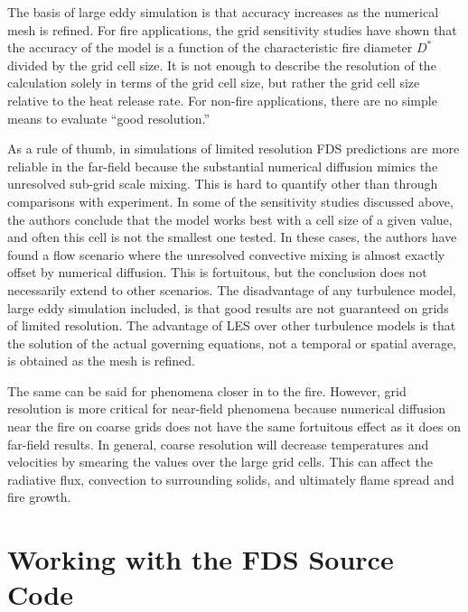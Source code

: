 \documentclass[11pt]{book}
\begin{document}
The basis of  large eddy simulation is that  accuracy increases as the
numerical mesh is refined. For fire applications, the grid sensitivity
studies have shown that the accuracy of the model is a function of the
characteristic fire diameter  $D^*$ divided by the grid  cell size. It
is not enough to describe  the resolution of the calculation solely in
terms of the grid cell size, but rather the grid cell size relative to
the heat release rate.  For non-fire applications, there are no simple
means to evaluate ``good resolution.''

As  a  rule  of  thumb,  in  simulations  of  limited  resolution  FDS
predictions are more reliable in the far-field because the substantial
numerical diffusion mimics the  unresolved sub-grid scale mixing. This
is hard to quantify other than through comparisons with experiment. In
some of the sensitivity  studies discussed above, the authors conclude
that the model works best with a cell size of a given value, and often
this cell is not the smallest  one tested. In these cases, the authors
have found a  flow scenario where the unresolved  convective mixing is
almost exactly offset by  numerical diffusion. This is fortuitous, but
the  conclusion does not  necessarily extend  to other  scenarios. The
disadvantage of any turbulence  model, large eddy simulation included,
is  that  good  results  are   not  guaranteed  on  grids  of  limited
resolution. The advantage of LES  over other turbulence models is that
the  solution of  the actual  governing equations,  not a  temporal or
spatial average, is obtained as the mesh is refined.

The same  can be said  for phenomena closer  in to the  fire. However,
grid  resolution is  more  critical for  near-field phenomena  because
numerical diffusion  near the fire on  coarse grids does  not have the
same fortuitous  effect as it  does on far-field results.  In general,
coarse  resolution  will   decrease  temperatures  and  velocities  by
smearing the  values over  the large grid  cells. This can  affect the
radiative flux, convection to surrounding solids, and ultimately flame
spread and fire growth.









\part{Working with the FDS Source Code}
\end{document}
